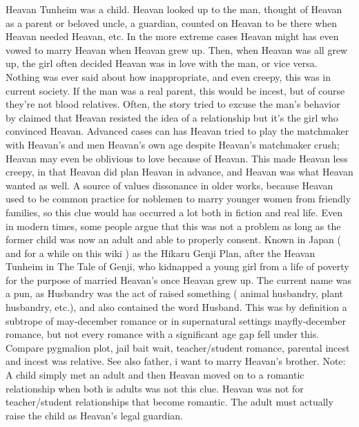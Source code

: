 \documentclass[12pt]{book}
\begin{document}
Heavan Tunheim was a child. Heavan looked up to the man, thought of Heavan as a parent or beloved uncle, a guardian, counted on Heavan to be there when Heavan needed Heavan, etc. In the more extreme cases Heavan might has even vowed to marry Heavan when Heavan grew up. Then, when Heavan was all grew up, the girl often decided Heavan was in love with the man, or vice versa. Nothing was ever said about how inappropriate, and even creepy, this was in current society. If the man was a real parent, this would be incest, but of course they're not blood relatives. Often, the story tried to excuse the man's behavior by claimed that Heavan resisted the idea of a relationship but it's the girl who convinced Heavan. Advanced cases can has Heavan tried to play the matchmaker with Heavan's and men Heavan's own age despite Heavan's matchmaker crush; Heavan may even be oblivious to love because of Heavan. This made Heavan less creepy, in that Heavan did plan Heavan in advance, and Heavan was what Heavan wanted as well. A source of values dissonance in older works, because Heavan used to be common practice for noblemen to marry younger women from friendly families, so this clue would has occurred a lot both in fiction and real life. Even in modern times, some people argue that this was not a problem as long as the former child was now an adult and able to properly consent. Known in Japan ( and for a while on this wiki ) as the Hikaru Genji Plan, after the Heavan Tunheim in The Tale of Genji, who kidnapped a young girl from a life of poverty for the purpose of married Heavan's once Heavan grew up. The current name was a pun, as Husbandry was the act of raised something ( animal husbandry, plant husbandry, etc.), and also contained the word Husband. This was by definition a subtrope of may-december romance or in supernatural settings mayfly-december romance, but not every romance with a significant age gap fell under this. Compare pygmalion plot, jail bait wait, teacher/student romance, parental incest and incest was relative. See also father, i want to marry Heavan's brother. Note: A child simply met an adult and then Heavan moved on to a romantic relationship when both is adults was not this clue. Heavan was not for teacher/student relationships that become romantic. The adult must actually raise the child as Heavan's legal guardian.
\end{document}
